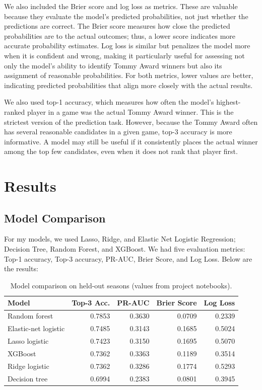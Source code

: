 \documentclass[11pt]{article}
\begin{document}
We also included the Brier score and log loss as metrics. These are valuable because they evaluate the model's predicted probabilities, not just whether the predictions are correct. The Brier score measures how close the predicted probabilities are to the actual outcomes; thus, a lower score indicates more accurate probability estimates. Log loss is similar but penalizes the model more when it is confident and wrong, making it particularly useful for assessing not only the model's ability to identify Tommy Award winners but also its assignment of reasonable probabilities. For both metrics, lower values are better, indicating predicted probabilities that align more closely with the actual results.

We also used top-1 accuracy, which measures how often the model's highest-ranked player in a game was the actual Tommy Award winner. This is the strictest version of the prediction task. However, because the Tommy Award often has several reasonable candidates in a given game, top-3 accuracy is more informative. A model may still be useful if it consistently places the actual winner among the top few candidates, even when it does not rank that player first.

\section{Results}

\subsection{Model Comparison}
For my models, we used Lasso, Ridge, and Elastic Net Logistic Regression; Decision Tree, Random Forest, and XGBoost. We had five evaluation metrics: Top-1 accuracy, Top-3 accuracy, PR-AUC, Brier Score, and Log Loss. Below are the results:

\begin{table}[H]
  \centering
  \caption{Model comparison on held-out seasons (values from project notebooks).}
  \label{tab:model-results}
  \begin{tabular}{@{}lrrrr@{}}
    \toprule
    \textbf{Model} & \textbf{Top-3 Acc.} & \textbf{PR-AUC} & \textbf{Brier Score} & \textbf{Log Loss} \\
    \midrule
    Random forest & 0.7853 & 0.3630 & 0.0709 & 0.2339 \\
    Elastic-net logistic & 0.7485 & 0.3143 & 0.1685 & 0.5024 \\
    Lasso logistic & 0.7423 & 0.3150 & 0.1695 & 0.5070 \\
    XGBoost & 0.7362 & 0.3363 & 0.1189 & 0.3514 \\
    Ridge logistic & 0.7362 & 0.3286 & 0.1774 & 0.5293 \\
    Decision tree & 0.6994 & 0.2383 & 0.0801 & 0.3945 \\
    \bottomrule
  \end{tabular}
\end{table}
\end{document}
